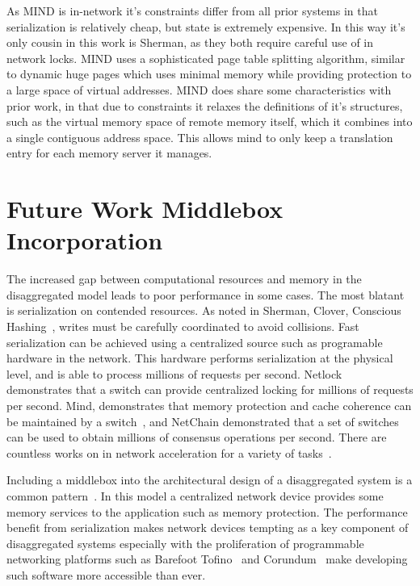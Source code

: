 As MIND is in-network it's constraints differ from all prior systems in that
serialization is relatively cheap, but state is extremely expensive. In this way
it's only cousin in this work is Sherman, as they both require careful use of in
network locks. MIND uses a sophisticated page table splitting algorithm, similar
to dynamic huge pages which uses minimal memory while providing protection to a
large space of virtual addresses. MIND does share some characteristics with
prior work, in that due to constraints it relaxes the definitions of it's
structures, such as the virtual memory space of remote memory itself, which it
combines into a single contiguous address space. This allows mind to only keep a
translation entry for each memory server it manages.


\section{Future Work Middlebox Incorporation}

The increased gap between computational resources and memory in the
disaggregated model leads to poor performance in some cases. The most blatant is
serialization on contended resources. As noted in Sherman, Clover, Conscious
Hashing~\cite{sherman,clover,one-sided-hash}, writes must be carefully
coordinated to avoid collisions. Fast serialization can be achieved using a
centralized source such as programable hardware in the network. This hardware
performs serialization at the physical level, and is able to process millions of
requests per second. Netlock~\cite{netlock} demonstrates that a switch can
provide centralized locking for millions of requests per second. Mind,
demonstrates that memory protection and cache coherence can be maintained by a
switch~\cite{mind}, and NetChain demonstrated that a set of switches can be used
to obtain millions of consensus operations per second. There are countless works
on in network acceleration for a variety of tasks~.

Including a middlebox into the architectural design of a disaggregated system is
a common pattern~\cite{disandapp}. In this model a centralized network device
provides some memory services to the application such as memory protection. The
performance benefit from serialization makes network devices tempting as a key
component of disaggregated systems especially with the proliferation of
programmable networking platforms such as Barefoot Tofino~\cite{tofino3} and
Corundum~\cite{corundum} make developing such software more accessible than ever.

